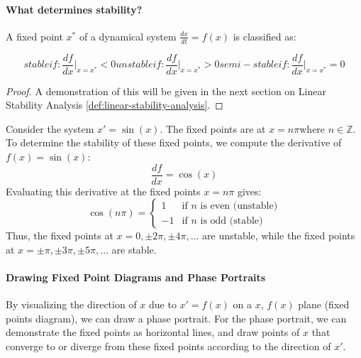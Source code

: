 \documentclass[11pt]{article}
\begin{document}
\paragraph{What determines stability?} A fixed point \( x^* \) of a dynamical system \( \frac{dx}{dt} = f(x) \) is classified as:

\begin{subequations}
    stable if:
    \begin{equation}
        \frac{df}{dx} \bigg|_{x=x^*} < 0
    \end{equation}
    unstable if:
    \begin{equation}
        \frac{df}{dx} \bigg|_{x=x^*} > 0
    \end{equation}
    semi-stable if:
    \begin{equation}
        \frac{df}{dx} \bigg|_{x=x^*} = 0
    \end{equation}
\end{subequations}

\begin{proof}
    A demonstration of this will be given in the next section on Linear Stability Analysis \ref{def:linear-stability-analysis}.
\end{proof}

\begin{example}
    Consider the system $x' = \sin(x)$. The fixed points are at \( x = n\pi \)where \( n \in \mathbb{Z} \). To determine the stability of these fixed points, we compute the derivative of \( f(x) = \sin(x) \):
    $$
    \frac{df}{dx} = \cos(x)
    $$
    Evaluating this derivative at the fixed points $x = n\pi$ gives:
    $$
    \cos(n\pi) =\begin{cases}
        1 & \text{if } n \text{ is even (unstable)} \\
        -1 & \text{if } n \text{ is odd (stable)}
    \end{cases}
    $$
    Thus, the fixed points at \( x = 0, \pm 2\pi, \pm 4\pi, \ldots \) are unstable, while the fixed points at \( x = \pm \pi, \pm 3\pi, \pm 5\pi, \ldots \) are stable. 
\end{example}

\paragraph{Drawing Fixed Point Diagrams and Phase Portraits} By visualizing the direction of $x$ due to $x' = f(x)$ on a $x$, $f(x)$ plane (fixed points diagram), we can draw a phase portrait. For the phase portrait, we can demonstrate the fixed points as horizontal lines, and draw points of $x$ that converge to or diverge from these fixed points according to the direction of $x'$.
\end{document}

